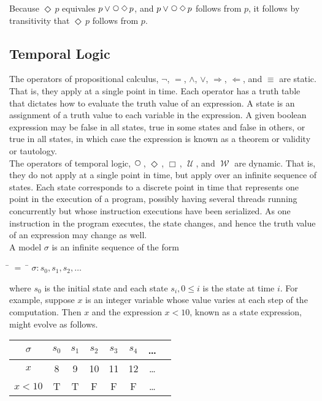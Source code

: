 \documentclass[fleqn, leqno]{article}
\newcommand{\mymathindent}{24pt} %
\newcommand{\impl}{\ensuremath{\Rightarrow}} %
\newcommand{\foll}{\ensuremath{\Leftarrow}} %
\newcommand{\Until}{\;\mathcal{U}\;}
\newcommand{\Wait}{\;\mathcal{W}\;}
\newcommand{\Next}{\;\,\text{\raisebox{3.5pt}{\circle{6}}}}
\newcommand{\Event}{\Diamond\,}
\newcommand{\Always}{\Box\,}
\begin{document}
Because $\Event p$ equivales $p \lor \Next\Event p$, and $p \lor \Next\Event p$ follows from $p$, it follows by
transitivity that $\Event p$ follows from $p$.

\subsection{Temporal Logic}

The operators of propositional calculus, $\lnot$, $=$, $\land$, $\lor$, $\impl$, $\foll$, and $\equiv$ are static.
That is, they apply at a single point in time.
Each operator has a truth table that dictates how to evaluate the truth value of an expression.
A state is an assignment of a truth value to each variable in the expression.
A given boolean expression may be false in all states, true in some states and false in others, or true in all states, in which case the expression is known as a theorem or validity or tautology.\\

The operators of temporal logic, $\Next$, $\Event$, $\Always$, $\Until$, and $\Wait$ are dynamic.
That is, they do not apply at a single point in time, but apply over an infinite sequence of states.
Each state corresponds to a discrete point in time that represents one point in the execution of a program,
possibly having several threads running concurrently but whose instruction executions have been serialized.
As one instruction in the program executes, the state changes, and hence the truth value of an expression may change as well.\\

A model $\sigma$ is an infinite sequence of the form

\begin{tabbing}
\hspace{\mymathindent} \= $= \;$ \= \kill
\> $\sigma: s_0, s_1, s_2, \dots$
\end{tabbing}

where $s_0$ is the initial state and each state $s_i, 0 \le i$ is the state at time $i$.
For example, suppose $x$ is an integer variable whose value varies at each step of the computation.
Then $x$ and the expression $x < 10$, known as a state expression, might evolve as follows.\\

\begin{tabular}{c|ccccccc}
$\sigma$ & $s_0$ & $s_1$ & $s_2$ & $s_3$ & $s_4$ & \dots \\
\hline
$x$ & 8 & 9 & 10 & 11 & 12 & \dots\\
$x<10$ & T & T & F & F & F & \dots
\end{tabular}\\
\end{document}
